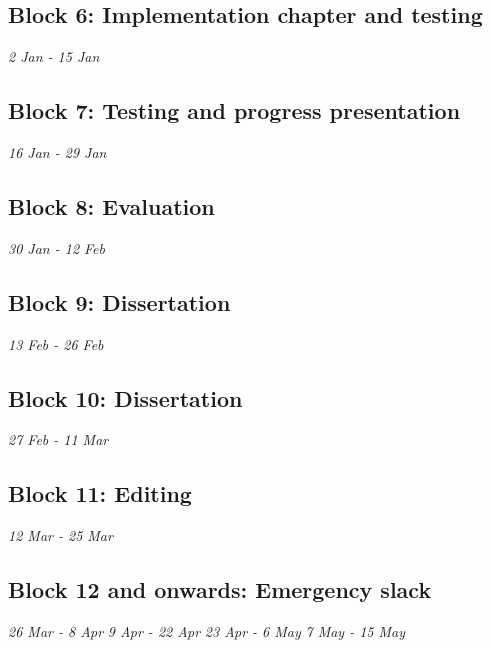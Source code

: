 \documentclass[12pt]{article}
\begin{document}
\subsection{Block 6: Implementation chapter and testing}
\emph{2 Jan - 15 Jan}  %
\subsection{Block 7: Testing and progress presentation}
\emph{16 Jan - 29 Jan} %
\subsection{Block 8: Evaluation}
\emph{30 Jan - 12 Feb} %
\subsection{Block 9: Dissertation}
\emph{13 Feb - 26 Feb} %
\subsection{Block 10: Dissertation}
\emph{27 Feb - 11 Mar} %
\subsection{Block 11: Editing}
\emph{12 Mar - 25 Mar} %
\subsection{Block 12 and onwards: Emergency slack}
\emph{26 Mar - 8 Apr}  %
\emph{9 Apr - 22 Apr}  %
\emph{23 Apr - 6 May}  %
\emph{7 May - 15 May}  %
\end{document}
